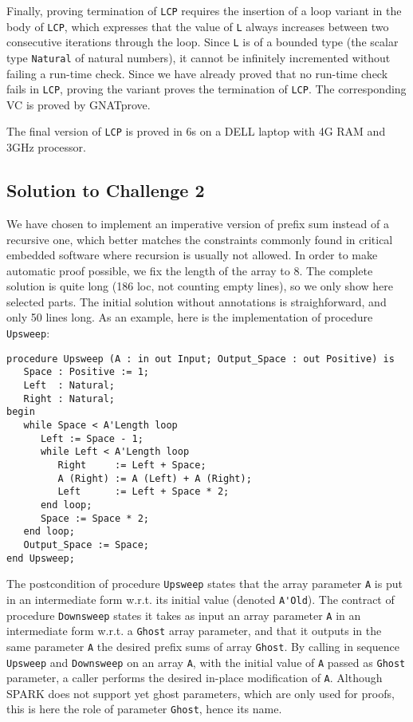 \documentclass[sttt,draft]{svjour}
\newcommand{\gnatprove}{GNATprove\xspace}
\newcommand{\wrt}{w.r.t.\xspace}
\begin{document}
Finally, proving termination of \verb|LCP| requires the insertion of a loop
variant in the body of \verb|LCP|, which expresses that the value of \verb|L|
always increases between two consecutive iterations through the loop. Since
\verb|L| is of a bounded type (the scalar type \verb|Natural| of natural
numbers), it cannot be infinitely incremented without failing a run-time
check. Since we have already proved that no run-time check fails in \verb|LCP|,
proving the variant proves the termination of \verb|LCP|. The corresponding VC
is proved by \gnatprove.

The final version of \verb|LCP| is proved in 6s on a DELL laptop with 4G RAM
and 3GHz processor.

\subsection{Solution to Challenge 2}

We have chosen to implement an imperative version of prefix sum instead of a
recursive one, which better matches the constraints commonly found in critical
embedded software where recursion is usually not allowed. In order to make
automatic proof possible, we fix the length of the array to 8. The complete
solution is quite long (186 loc, not counting empty lines), so we only show
here selected parts. The initial solution without annotations is
straighforward, and only 50 lines long. As an example, here is the
implementation of procedure \verb|Upsweep|:

\begin{footnotesize}
\begin{verbatim}
procedure Upsweep (A : in out Input; Output_Space : out Positive) is
   Space : Positive := 1;
   Left  : Natural;
   Right : Natural;
begin
   while Space < A'Length loop
      Left := Space - 1;
      while Left < A'Length loop
         Right     := Left + Space;
         A (Right) := A (Left) + A (Right);
         Left      := Left + Space * 2;
      end loop;
      Space := Space * 2;
   end loop;
   Output_Space := Space;
end Upsweep;
\end{verbatim}
\end{footnotesize}

The postcondition of procedure \verb|Upsweep| states that
the array parameter \verb|A| is put in an intermediate form \wrt its initial
value (denoted \verb|A'Old|). The contract of procedure \verb|Downsweep| states
it takes as input an array parameter \verb|A| in an intermediate form \wrt a
\verb|Ghost| array parameter, and that it outputs in the same parameter
\verb|A| the desired prefix sums of array \verb|Ghost|. By calling in sequence
\verb|Upsweep| and \verb|Downsweep| on an array \verb|A|, with the initial
value of \verb|A| passed as \verb|Ghost| parameter, a caller performs the
desired in-place modification of \verb|A|. Although SPARK does not support yet
ghost parameters, which are only used for proofs, this is here the role of
parameter \verb|Ghost|, hence its name.
\end{document}
